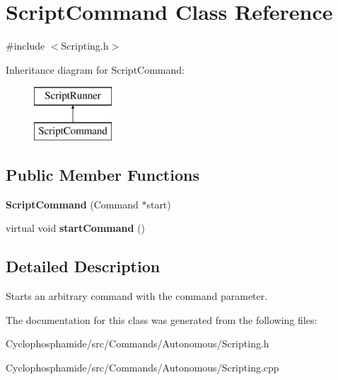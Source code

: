 \hypertarget{class_script_command}{}\section{Script\+Command Class Reference}
\label{class_script_command}


{\ttfamily \#include $<$Scripting.\+h$>$}

Inheritance diagram for Script\+Command\+:\begin{figure}[H]
\begin{center}
\leavevmode
\includegraphics[height=2.000000cm]{class_script_command}
\end{center}
\end{figure}
\subsection*{Public Member Functions}
\begin{DoxyCompactItemize}
\item 
\hypertarget{class_script_command_aff7321091c96a2bef01c8756882feb2f}{}{\bfseries Script\+Command} (Command $\ast$start)\label{class_script_command_aff7321091c96a2bef01c8756882feb2f}

\item 
\hypertarget{class_script_command_a69cf76011e926f7bb491684306a6c328}{}virtual void {\bfseries start\+Command} ()\label{class_script_command_a69cf76011e926f7bb491684306a6c328}

\end{DoxyCompactItemize}


\subsection{Detailed Description}
Starts an arbitrary command with the command parameter. 

The documentation for this class was generated from the following files\+:\begin{DoxyCompactItemize}
\item 
Cyclophosphamide/src/\+Commands/\+Autonomous/Scripting.\+h\item 
Cyclophosphamide/src/\+Commands/\+Autonomous/Scripting.\+cpp\end{DoxyCompactItemize}
